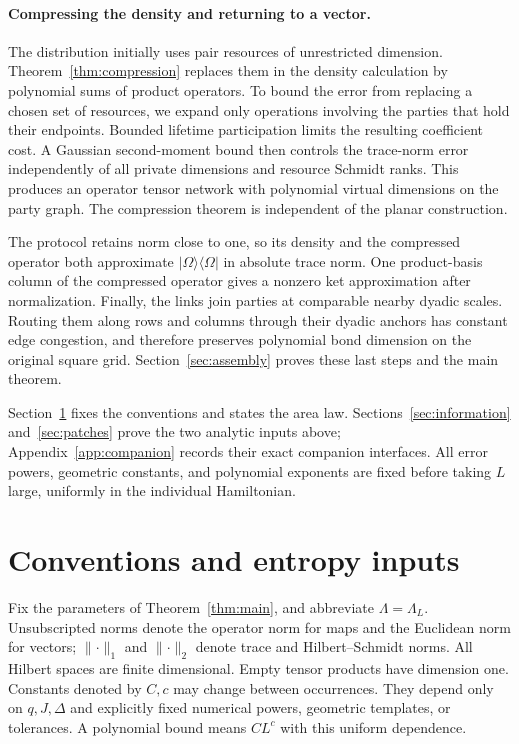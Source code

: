 \documentclass[11pt]{article}
\numberwithin{equation}{section}
\theoremstyle{definition}
\theoremstyle{remark}
\newcommand{\norm}[1]{\lVert #1\rVert}
\begin{document}
\paragraph{Compressing the density and returning to a vector.}
The distribution initially uses pair resources of unrestricted dimension.
Theorem~\ref{thm:compression} replaces them in the density calculation by
polynomial sums of product operators. To bound the error from
replacing a chosen set of resources, we expand only operations involving
the parties that hold their endpoints. Bounded lifetime participation
limits the resulting coefficient cost. A Gaussian
second-moment bound then controls the trace-norm error independently of
all private dimensions and resource Schmidt ranks. This produces an
operator tensor network with polynomial virtual dimensions on the party
graph. The compression theorem is independent of the planar construction.

The protocol retains norm close to one, so its density and the compressed
operator both approximate $|\Omega\rangle\langle\Omega|$ in absolute trace
norm. One product-basis column of the compressed operator gives a nonzero
ket approximation after normalization. Finally, the links join parties
at comparable nearby dyadic scales. Routing them along rows and columns
through their dyadic anchors has constant edge congestion, and therefore
preserves polynomial bond dimension on the original square grid.
Section~\ref{sec:assembly} proves these last steps and the main theorem.

Section~\ref{sec:preliminaries} fixes the conventions and states the area
law. Sections~\ref{sec:information} and~\ref{sec:patches} prove the two
analytic inputs above; Appendix~\ref{app:companion} records their exact
companion interfaces. All error powers, geometric constants, and
polynomial exponents are fixed before taking $L$ large, uniformly in the
individual Hamiltonian.

\section{Conventions and entropy inputs}\label{sec:preliminaries}

Fix the parameters of Theorem~\ref{thm:main}, and abbreviate
$\Lambda=\Lambda_L$. Unsubscripted norms denote the operator norm for maps
and the Euclidean norm for vectors; $\norm{\cdot}_1$ and
$\norm{\cdot}_2$ denote trace and Hilbert--Schmidt norms. All Hilbert spaces
are finite dimensional. Empty tensor products have dimension one.
Constants denoted by $C,c$ may change between occurrences. They depend only
on $q,J,\Delta$ and explicitly fixed numerical powers, geometric templates,
or tolerances. A polynomial bound means $CL^c$ with this uniform dependence.
\end{document}
